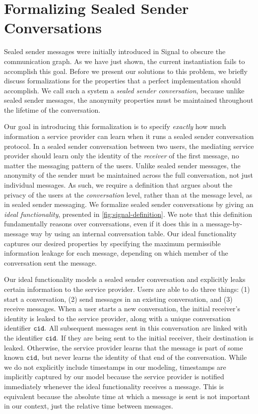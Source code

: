 

\section{Formalizing Sealed Sender Conversations}\label{sec:signal-secdef}
Sealed sender messages were initially introduced in Signal to obscure the communication graph.  As we have just shown, the current instantiation fails to accomplish this goal.  Before we present our solutions to this problem, we briefly discuss formalizations for the properties that a perfect implementation should accomplish.  We call such a system a {\em sealed sender conversation}, because unlike sealed sender messages, the anonymity properties must be maintained throughout the lifetime of the conversation.

Our goal in introducing this formalization is to specify {\em exactly} how much information a service provider can learn when it runs a sealed sender conversation protocol.  In a sealed sender conversation between two users, the mediating service provider should learn only the identity of the {\em receiver} of the first message, no matter the messaging pattern of the users. Unlike sealed sender messages, the anonymity of the sender must be maintained across the full conversation, not just individual messages.  As such, we require a definition that argues about the privacy of the users at the {\em conversation} level, rather than at the message level, as in sealed sender messaging.  We formalize sealed sender conversations by giving an {\em ideal functionality}, presented in \cref{fig:signal-definition}.  We note that this definition fundamentally reasons over conversations, even if it does this in a message-by-message way by using an internal conversation table.  Our ideal functionality captures our desired properties by specifying the maximum permissible information leakage for each message, depending on which member of the conversation sent the message.

Our ideal functionality models a sealed sender conversation and explicitly leaks certain information to the service provider.  Users are able to do three things: (1) start a conversation, (2) send messages in an existing conversation, and (3) receive messages.  When a user starts a new conversation, the initial receiver's identity is leaked to the service provider, along with a unique conversation identifier $\mathtt{cid}.$  All subsequent messages sent in this conversation are linked with the identifier $\mathtt{cid}.$  If they are being sent to the initial receiver, their destination is leaked.  Otherwise, the service provider learns that the message is part of some known $\mathtt{cid},$ but never learns the identity of that end of the conversation.  While we do not explicitly include timestamps in our modeling, timestamps are implicitly captured by our model because the service provider is notified immediately whenever the ideal functionality receives a message.  This is equivalent because the absolute time at which a message is sent is not important in our context, just the relative time between messages.

